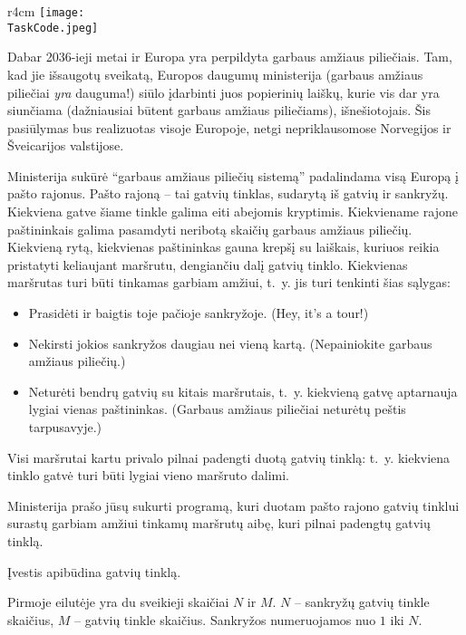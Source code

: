 \documentclass{boi2014-lt}
\renewcommand{\TaskCode}{postmen}
\begin{document}
    \begin{wrapfigure}[8]{r}{4cm}
        \vspace{-18pt}
		\texttt{[image: \\TaskCode.jpeg]}
	\end{wrapfigure}
	Dabar 2036-ieji metai ir Europa yra perpildyta garbaus amžiaus piliečiais.
	Tam, kad jie išsaugotų sveikatą, Europos daugumų ministerija (garbaus amžiaus
	piliečiai \emph{yra} dauguma!) siūlo įdarbinti juos popierinių laiškų,
	kurie vis dar yra siunčiama (dažniausiai būtent garbaus amžiaus piliečiams),
	išnešiotojais. Šis pasiūlymas bus realizuotas visoje Europoje, netgi
	nepriklausomose Norvegijos ir Šveicarijos valstijose.

    Ministerija sukūrė ``garbaus amžiaus piliečių sistemą'' padalindama visą
    Europą į pašto rajonus. Pašto rajoną -- tai gatvių tinklas, sudarytą iš
    gatvių ir sankryžų. Kiekviena gatve šiame tinkle galima eiti abejomis
    kryptimis. Kiekviename rajone paštininkais galima pasamdyti neribotą skaičių
    garbaus amžiaus piliečių. Kiekvieną rytą, kiekvienas paštininkas gauna krepšį
    su laiškais, kuriuos reikia pristatyti keliaujant maršrutu, dengiančiu dalį
    gatvių tinklo. Kiekvienas maršrutas turi būti tinkamas garbiam amžiui, t.~y.
    jis turi tenkinti šias sąlygas:
    \begin{itemize}
        \item Prasidėti ir baigtis toje pačioje sankryžoje. (Hey, it’s a tour!)
        \item Nekirsti jokios sankryžos daugiau nei vieną kartą. (Nepainiokite
            garbaus amžiaus piliečių.)
        \item Neturėti bendrų gatvių su kitais maršrutais, t.~y. kiekvieną gatvę
            aptarnauja lygiai vienas paštininkas. (Garbaus amžiaus piliečiai
            neturėtų peštis tarpusavyje.)
    \end{itemize}

    Visi maršrutai kartu privalo pilnai padengti duotą gatvių tinklą: t.~y.
    kiekviena tinklo gatvė turi būti lygiai vieno maršruto dalimi.

    \Task
    Ministerija prašo jūsų sukurti programą, kuri duotam pašto rajono gatvių
    tinklui surastų garbiam amžiui tinkamų maršrutų aibę, kuri pilnai padengtų
    gatvių tinklą.

    \Input
    Įvestis apibūdina gatvių tinklą.
    
    Pirmoje eilutėje yra du sveikieji skaičiai $N$ ir $M$. $N$ -- sankryžų gatvių
    tinkle skaičius, $M$ -- gatvių tinkle skaičius. Sankryžos numeruojamos nuo
    $1$ iki $N$.
\end{document}
